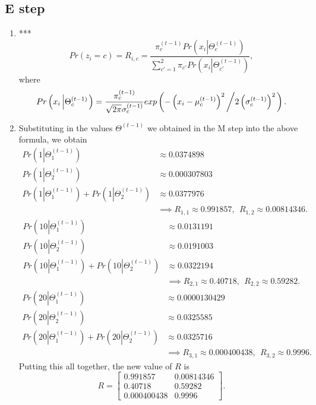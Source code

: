 \documentclass{article}
\newcommand{\bbm}{\begin{bmatrix}}
\newcommand{\ebm}{\end{bmatrix}}
\begin{document}
\subsection{E step}
\begin{enumerate}
    \item ***
    \[
        Pr(z_i=c)=R_{i,c} = \frac{\pi^{(t-1)}_cPr\left(x_i\left|\Theta^{(t-1)}_c\right.\right)}{\sum^2_{c'=1}\pi_{c'}Pr\left(x_i\left|\Theta_{c'}^{(t-1)}\right.\right)},
    \]
    where
    \[
        Pr\left(x_i\left|\Theta^{(t-1)}_c\right.\right) = \frac{\pi_c^{(t-1)}}{\sqrt{2\pi}\sigma_c^{(t-1)}}exp\left(-\left(x_i-\mu_c^{(t-1)}\right)^2\left/2\left(\sigma^{(t-1)}_c\right)^2\right.\right).
    \]
    \item Substituting in the values $\Theta^{(t-1)}$ we obtained in the M step into the above formula, we obtain
    \begin{align*}
        Pr\left(1\left|\Theta^{(t-1)}_1\right.\right)&\approx 0.0374898 \\
        Pr\left(1\left|\Theta^{(t-1)}_2\right.\right)&\approx 0.000307803\\
        Pr\left(1\left|\Theta^{(t-1)}_1\right.\right)+Pr\left(1\left|\Theta^{(t-1)}_2\right.\right)&\approx  0.0377976\\
        &\implies R_{1,1}\approx 0.991857,~~R_{1,2}\approx 0.00814346.
    \end{align*}
    \begin{align*}
        Pr\left(10\left|\Theta^{(t-1)}_1\right.\right)&\approx 0.0131191 \\
        Pr\left(10\left|\Theta^{(t-1)}_2\right.\right)&\approx  0.0191003\\
        Pr\left(10\left|\Theta^{(t-1)}_1\right.\right)+Pr\left(10\left|\Theta^{(t-1)}_2\right.\right)&\approx  0.0322194\\
        &\implies R_{2,1}\approx 0.40718,~~R_{2,2}\approx 0.59282.
    \end{align*}
    \begin{align*}
        Pr\left(20\left|\Theta^{(t-1)}_1\right.\right)&\approx  0.0000130429\\
        Pr\left(20\left|\Theta^{(t-1)}_2\right.\right)&\approx 0.0325585 \\
        Pr\left(20\left|\Theta^{(t-1)}_1\right.\right)+Pr\left(20\left|\Theta^{(t-1)}_2\right.\right)&\approx 0.0325716\\
        &\implies R_{3,1}\approx 0.000400438 ,~~R_{3,2}\approx 0.9996.
    \end{align*}
    Putting this all together, the new value of $R$ is 
    \[
        R=\bbm 0.991857 & 0.00814346 \\
        0.40718 & 0.59282 \\
        0.000400438 & 0.9996
        \ebm.
    \]
\end{enumerate}
\end{document}
